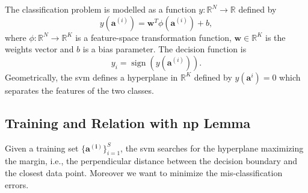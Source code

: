 \documentclass[draftcls,onecolumn,12pt]{IEEEtran}
\newcommand{\ie}{i.e., }
\DeclareMathOperator{\sign}{sign}
\begin{document}
The classification problem is modelled as a function $y: \mathbb{R}^N \to \mathbb{R}$ defined by
\begin{equation}
\label{eq:svm}
y(\mathbf{a}^{(i)}) = \mathbf{w}^T \phi (\mathbf{a}^{(i)}) + b,
\end{equation}
where $\phi: \mathbb{R}^N \to \mathbb{R}^K$ is a feature-space transformation function, $\mathbf{w} \in \mathbb{R}^K$ is the weights vector and $b$ is a bias parameter. The decision function is 
\begin{equation}
\label{eq:sign}
y_i = \sign(y(\mathbf{a}^{(i)})).
\end{equation}
Geometrically, the \ac{svm} defines a hyperplane in $\mathbb{R}^K$ defined by $y(\mathbf{a}^i)=0$ which separates the features of the two classes.

\subsection{Training and Relation with \ac{np} Lemma}
Given a training set $\{\mathbf{a^{(i)}}\}_{i=1}^S$, the \ac{svm} searches for the hyperplane maximizing the margin, \ie the perpendicular distance between the decision boundary and the closest data point. 
Moreover we want to minimize the mis-classification errors.

\end{document}
